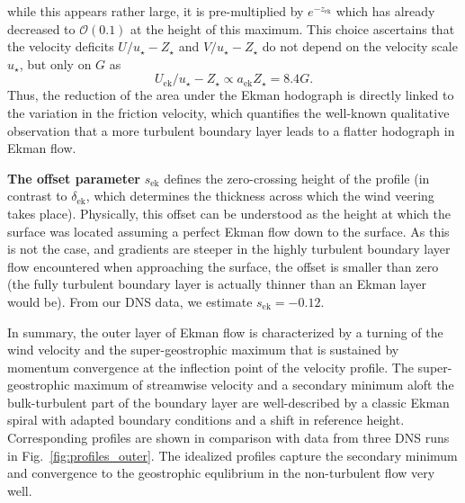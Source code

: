 \documentclass[smallcondensed,final]{svjour3}
\begin{document}
while this appears rather large, it is pre-multiplied by $e^{-z_\mathrm{ek}}$ which has already decreased
to $\mathcal{O}(0.1)$ at the height of this maximum.
%
This choice ascertains that the velocity deficits $U/u_\star-Z_\star$ and $V/u_\star-Z_\star$ do not
depend on the velocity scale $u_\star$, but only on $G$ as
\begin{equation}
  U_\mathrm{ek}/u_\star-Z_\star \propto a_\mathrm{ek} Z_\star = 8.4G.
  \label{eqn:hodograph_scaling}
\end{equation}
Thus, the reduction of the area under the Ekman hodograph is directly linked to the variation
in the friction velocity, which quantifies the well-known qualitative observation that a more turbulent boundary
layer leads to a flatter hodograph in Ekman flow.
%
\par
%
\textbf{The offset parameter} $s_\mathrm{ek}$ defines the zero-crossing height of the profile
(in contrast to $\delta_\mathrm{ek}$, which determines the thickness across which the wind veering takes place). 
%
Physically, this offset can be understood as the height at which the surface was located assuming
a perfect Ekman flow down to the surface.
%
As this is not the case, and gradients are steeper in the highly turbulent boundary layer flow encountered
when approaching the surface, the offset is smaller than zero (the fully turbulent boundary layer is
actually thinner than an Ekman layer would be).
%
From our DNS data, we estimate $s_\mathrm{ek}=-0.12$. 
%
\par 
% 
In summary, the outer layer of Ekman flow is characterized by a turning of the wind
velocity and the super-geostrophic maximum that is sustained by momentum convergence
at the inflection point of the velocity profile.
%
The super-geostrophic maximum of streamwise velocity and a secondary minimum aloft the bulk-turbulent part of
the boundary layer are well-described by a classic Ekman spiral with adapted boundary conditions and a shift
in reference height.
%
Corresponding profiles are shown in comparison with data from three DNS runs in Fig.~\ref{fig:profiles_outer}.
The idealized profiles capture the secondary minimum and convergence to the geostrophic equlibrium in the
non-turbulent flow very well.
%
\end{document}
